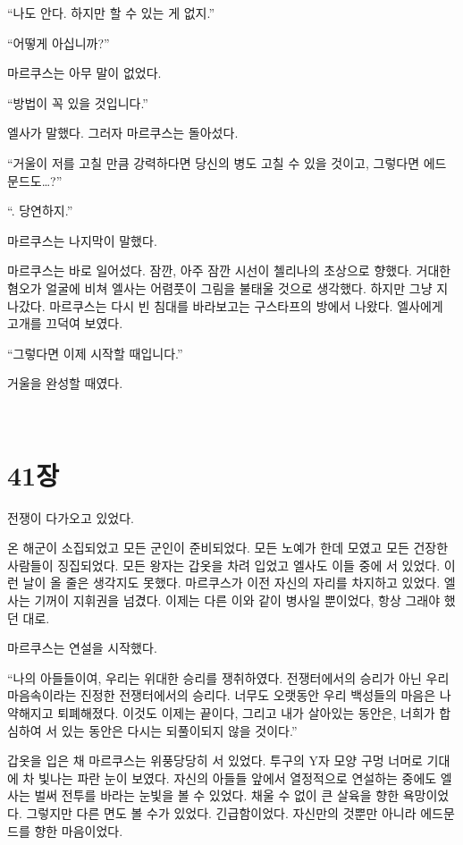 ``나도 안다. 하지만 할 수 있는 게 없지.''

``어떻게 아십니까?''

마르쿠스는 아무 말이 없었다.

``방법이 꼭 있을 것입니다.''

엘사가 말했다. 그러자 마르쿠스는 돌아섰다.

``거울이 저를 고칠 만큼 강력하다면 당신의 병도 고칠 수 있을 것이고, 그렇다면 에드문드도\ldots?''

``. 당연하지.''

마르쿠스는 나지막이 말했다.

마르쿠스는 바로 일어섰다. 잠깐, 아주 잠깐 시선이 첼리나의 초상으로 향했다. 거대한 혐오가 얼굴에 비쳐 엘사는 어렴풋이 그림을 불태울 것으로 생각했다. 하지만 그냥 지나갔다. 마르쿠스는 다시 빈 침대를 바라보고는 구스타프의 방에서 나왔다. 엘사에게 고개를 끄덕여 보였다.

``그렇다면 이제 시작할 때입니다.''

거울을 완성할 때였다.

﻿
\chapter[41장  ~~][41장\hspace*{.5em}~~]{41장 \ ~~}



전쟁이 다가오고 있었다.

온 해군이 소집되었고 모든 군인이 준비되었다. 모든 노예가 한데 모였고 모든 건장한 사람들이 징집되었다. 모든 왕자는 갑옷을 차려 입었고 엘사도 이들 중에 서 있었다. 이런 날이 올 줄은 생각지도 못했다. 마르쿠스가 이전 자신의 자리를 차지하고 있었다. 엘사는 기꺼이 지휘권을 넘겼다. 이제는 다른 이와 같이 병사일 뿐이었다, 항상 그래야 했던 대로.

마르쿠스는 연설을 시작했다.

``나의 아들들이여, 우리는 위대한 승리를 쟁취하였다. 전쟁터에서의 승리가 아닌 우리 마음속이라는 진정한 전쟁터에서의 승리다. 너무도 오랫동안 우리 백성들의 마음은 나약해지고 퇴폐해졌다. 이것도 이제는 끝이다, 그리고 내가 살아있는 동안은, 너희가 합심하여 서 있는 동안은 다시는 되풀이되지 않을 것이다.''

갑옷을 입은 채 마르쿠스는 위풍당당히 서 있었다. 투구의 Y자 모양 구멍 너머로 기대에 차 빛나는 파란 눈이 보였다. 자신의 아들들 앞에서 열정적으로 연설하는 중에도 엘사는 벌써 전투를 바라는 눈빛을 볼 수 있었다. 채울 수 없이 큰 살육을 향한 욕망이었다. 그렇지만 다른 면도 볼 수가 있었다. 긴급함이었다. 자신만의 것뿐만 아니라 에드문드를 향한 마음이었다.

